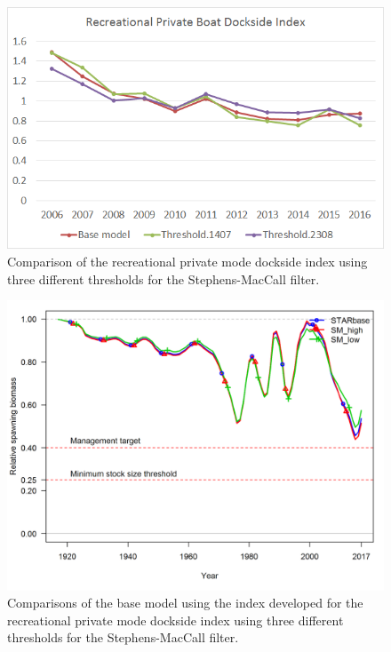 \documentclass[12pt,]{article}
\begin{document}
\vspace{5cm}

\begin{figure}[htbp]
\centering
\includegraphics{Figures/Request3a.png}
\caption{Comparison of the recreational private mode dockside index
using three different thresholds for the Stephens-MacCall filter.
\label{fig:Request3a}}
\end{figure}

\begin{figure}[htbp]
\centering
\includegraphics{Figures/Request3b.png}
\caption{Comparisons of the base model using the index developed for the
recreational private mode dockside index using three different
thresholds for the Stephens-MacCall filter.\label{fig:Request3b}}
\end{figure}
\end{document}
